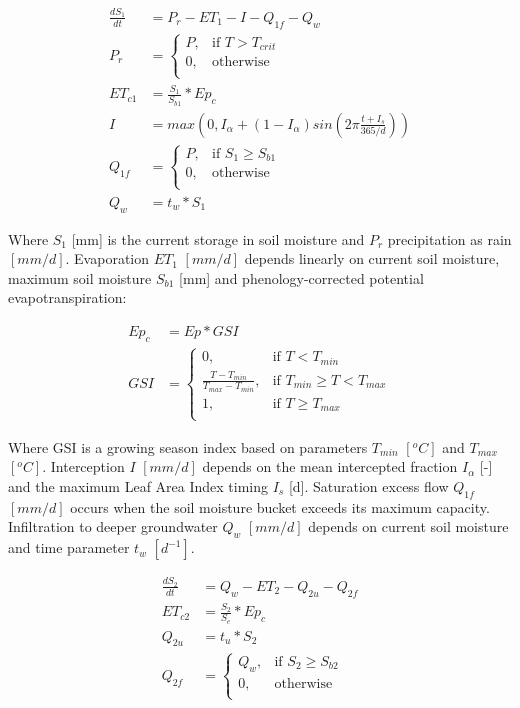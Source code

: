 \begin{align}
	\frac{dS_1}{dt} &= P_r-ET_1-I-Q_{1f}-Q_w \\
	P_r &= \begin{cases}
		P, &\text{if } T > T_{crit} \\
		0, & \text{otherwise} \\
	\end{cases} \\
	ET_{c1} &= \frac{S_1}{S_{b1}}*Ep_c\\
	I &= max\left(0,I_{\alpha} + (1-I_{\alpha})sin\left(2\pi\frac{t+I_{s}}{365/d}\right)\right)\\
	Q_{1f} &= \begin{cases}
		P, &\text{if } S_1 \geq S_{b1} \\
		0, & \text{otherwise} \\
	\end{cases} \\
	Q_w &= t_w*S_1
\end{align}


Where $S_1$ [mm] is the current storage in soil moisture and $P_r$ precipitation as rain $[mm/d]$. Evaporation $ET_1$ $[mm/d]$ depends linearly on current soil moisture, maximum soil moisture $S_{b1}$ [mm] and phenology-corrected potential evapotranspiration: 

\begin{align}
	Ep_c &= Ep*GSI \\
	GSI &= \begin{cases}
		0 , &\text{if } T < T_{min} \\
		\frac{T-T_{min}}{T_{max}-T_{min}}, &\text{if } T_{min} \geq T < T_{max} \\
		1, &\text{if } T \geq T_{max} \\
	\end{cases}
\end{align}

Where GSI is a growing season index based on parameters $T_{min}$ $[^oC]$ and $T_{max}$ $[^oC]$. Interception $I$ $[mm/d]$ depends on the mean intercepted fraction $I_{\alpha}$ [-] and the maximum Leaf Area Index timing $I_{s}$ [d]. Saturation excess flow $Q_{1f}$  $[mm/d]$ occurs when the soil moisture bucket exceeds its maximum capacity. Infiltration to deeper groundwater $Q_w$  $[mm/d]$ depends on current soil moisture and time parameter $t_w$  $[d^{-1}]$.

\begin{align}
	\frac{dS_2}{dt} &= Q_w-ET_2-Q_{2u} - Q_{2f}\\
	ET_{c2} &= \frac{S_2}{S_{e}}*Ep_c\\
	Q_{2u} &= t_u*S_2\\
	Q_{2f} &= \begin{cases}
		Q_w, &\text{if } S_2 \geq S_{b2} \\
		0, & \text{otherwise} \\
	\end{cases}
\end{align}

